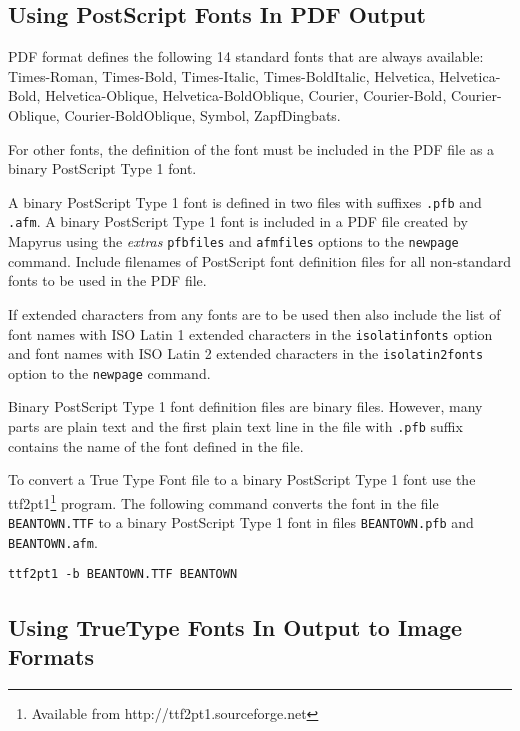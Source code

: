 \subsection{Using PostScript Fonts In PDF Output}
\label{pdffonts}

PDF format defines the following 14 standard fonts
that are always available:
Times-Roman, Times-Bold, Times-Italic, Times-BoldItalic,
Helvetica, Helvetica-Bold, Helvetica-Oblique, Helvetica-BoldOblique,
Courier, Courier-Bold, Courier-Oblique, Courier-BoldOblique,
Symbol, ZapfDingbats.

For other fonts, the definition of the font must be included
in the PDF file as a binary PostScript Type 1 font.

A binary PostScript Type 1 font is defined in two files with suffixes
\texttt{.pfb} and \texttt{.afm}.  A binary PostScript Type 1
font is included in a PDF file created
by Mapyrus using the
\textit{extras} \texttt{pfbfiles} and \texttt{afmfiles}
options to the \texttt{newpage} command.
Include filenames of PostScript font definition files for all
non-standard fonts to be used in the PDF file.

If extended characters from any fonts are to be used then also
include the list of font names with ISO Latin 1 extended characters
in the \texttt{isolatinfonts} option and font names with ISO
Latin 2 extended characters in the
\texttt{isolatin2fonts} option to the \texttt{newpage} command.

Binary PostScript Type 1 font definition files are binary files.
However, many parts are plain text and the first plain text
line in the file with \texttt{.pfb} suffix contains the name
of the font defined in the file.

To convert a True Type Font file to a binary  PostScript Type 1 font use the
ttf2pt1\footnote{Available from http://ttf2pt1.sourceforge.net} program.  The
following command converts the font in the file \texttt{BEANTOWN.TTF} to a
binary PostScript Type 1 font in files
\texttt{BEANTOWN.pfb} and
\texttt{BEANTOWN.afm}.

\begin{verbatim}
ttf2pt1 -b BEANTOWN.TTF BEANTOWN
\end{verbatim}

\subsection{Using TrueType Fonts In Output to Image Formats}
\label{ttffonts}


